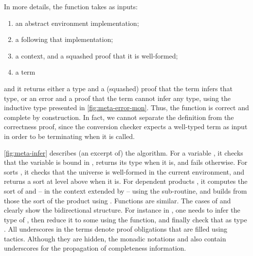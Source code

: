 In more details, the function takes as inputs:
\begin{enumerate}
  \item an abstract environment implementation;
  \item a  following that implementation;
  \item a context, and a squashed proof that it is well-formed;
  \item a term
\end{enumerate}
and it returns either a type and a (squashed) proof that the term infers that type, or
an error and a proof that the term cannot infer any type, using the inductive type presented in
\cref{fig:meta-error-mon}.
Thus, the function is correct and complete by construction.
In fact, we cannot separate
the definition from the correctness proof, since the conversion checker
expects a well-typed term as input in order to be terminating when it is called.

\begin{figure*}
  \caption{Definition of  (excerpt)}
  \label{fig:meta-infer}
\end{figure*}

\cref{fig:meta-infer} describes (an excerpt of) the algorithm.
%
For a variable , it checks that the variable is bound in
, returns its type when it is, and fails otherwise.
%
For sorts , it checks that the universe is well-formed in the current
environment, and returns a sort at level above when it is.
%
For dependent products , it computes the sort of
 and  – in the context extended by
–  using the  sub-routine,%
and builds from those the sort of the product using .
Functions are similar.
%
The cases of  and  clearly show the bidirectional
structure. For instance in
, one needs to infer the type  of ,
then reduce it to some  using the
 function, and finally check that  as
type .
%
All underscores \coqe{_} in the terms denote proof obligations that are filled using
tactics. Although they are hidden, the monadic notations \coqe{;;}
and  also contain underscores for the propagation of completeness
information.%

